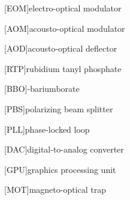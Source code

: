 [EOM]{electro-optical modulator}

[AOM]{acousto-optical modulator}

[AOD]{acousto-optical deflector}

[RTP]{rubidium tanyl phosphate}

[BBO]{\textbeta-bariumborate}

[PBS]{polarizing beam splitter}

[PLL]{phase-locked loop}

[DAC]{digital-to-analog converter}

[GPU]{graphics processing unit}

[MOT]{magneto-optical trap}
